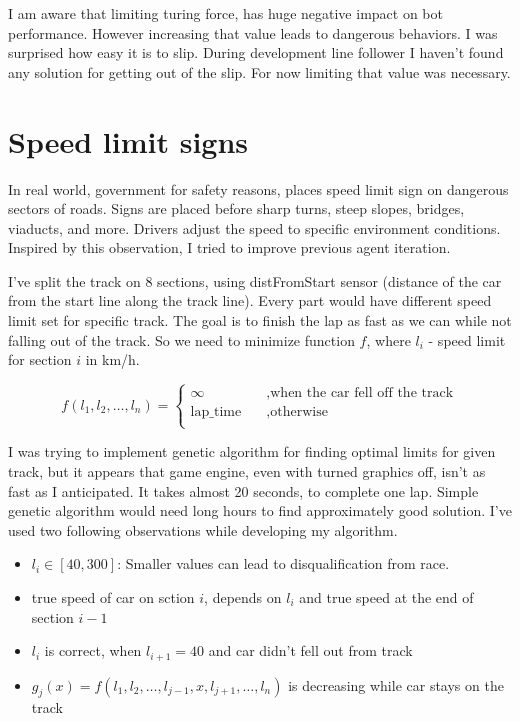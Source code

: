 \documentclass[declaration,shortabstract,english,inz]{iithesis}
\begin{document}
I am aware that limiting turing force, has huge negative impact on bot performance. However increasing that value leads to dangerous behaviors. I was surprised how easy it is to slip. During development line follower I haven't found any solution for getting out of the slip. For now limiting that value was necessary.

\section{Speed limit signs}

In real world, government for safety reasons, places speed limit sign on dangerous sectors of roads. Signs are placed before sharp turns, steep slopes, bridges, viaducts, and more. Drivers adjust the speed to specific environment conditions. Inspired by this observation, I tried to improve previous agent iteration. 

I've split the track on 8 sections, using distFromStart sensor (distance of the car from the start line along the track line). Every part would have different speed limit set for specific track. The goal is to finish the lap as fast as we can while not falling out of the track. So we need to minimize function $f$, where $l_i$ - speed limit for section $i$ in km/h.

$$ f(l_1, l_2, \dots, l_n ) =  \begin{cases}
    \infty &\quad , \text{when the car fell off the track}\\
    \text{lap\_time}  &\quad , \text{otherwise} \\
  \end{cases}
 $$

I was trying to implement genetic algorithm for finding optimal limits for given track, but it appears that game engine, even with turned graphics off, isn't as fast as I anticipated. It takes almost 20 seconds, to complete one lap. Simple genetic algorithm would need long hours to find approximately good solution. I've used two following observations while developing my algorithm.

\begin{itemize}
    \item  $l_i \in [40, 300]$:  Smaller values can lead to disqualification from race.
    \item  true speed of car on sction $i$, depends on $l_i$ and true speed at the end of section $i-1$
    \item
    $l_i$ is correct, when $l_{i+1} = 40$ and car didn't fell out from track
    \item  $g_j(x) = f(l_1,l_2, \dots,l_{j-1}, x, l_{j+1}, \dots, l_n)$ is decreasing while car stays on the track
    
\end{itemize}
\end{document}
